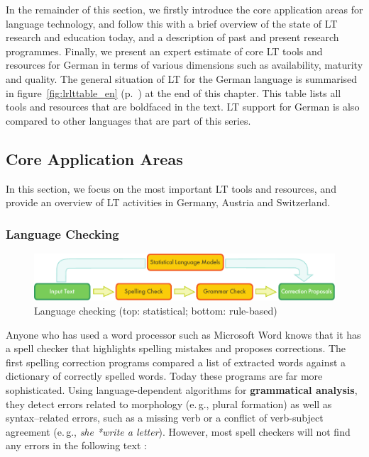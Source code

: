 \begin{multicols}{2}
In the remainder of this section, we firstly introduce the core application areas for language technology, and follow this with a brief overview of the state of LT research and education today, and a description of past and present research programmes. Finally, we present an expert estimate of core LT tools and resources for German in terms of various dimensions such as availability, maturity and quality. 
The general situation of LT for the German language is summarised in
figure~\ref{fig:lrlttable_en} (p.~\pageref{fig:lrlttable_en}) at the end of this chapter. This table lists all tools and
resources that are boldfaced in the text.
LT support for German is also compared to other languages that are part of this series.

\subsection{Core Application Areas}

In this section, we focus on the most important LT tools and resources, and provide an overview of LT activities in Germany, Austria and Switzerland. 

\subsubsection{Language Checking}

\begin{figure}[t]
  \center
  \includegraphics[width=\textwidth]{../_media/english/language_checking}
  \caption{Language checking (top: statistical; bottom: rule-based)}
  \label{fig:langcheckingaarch_en}
\end{figure}

Anyone who has used a word processor such as Microsoft Word knows that it has a spell checker that highlights spelling mistakes and proposes corrections. The first spelling correction programs compared a list of extracted words against a dictionary of correctly spelled words. Today these programs are far more sophisticated. Using language-dependent algorithms for \textbf{grammatical analysis}, they detect errors related to morphology (e.\,g., plural formation) as well as syntax–related errors, such as a missing verb or a conflict of verb-subject agreement (e.\,g., \textit{she *write a letter}). However, most spell checkers will not find any errors in the following text \cite{zar1}:


\end{multicols}
